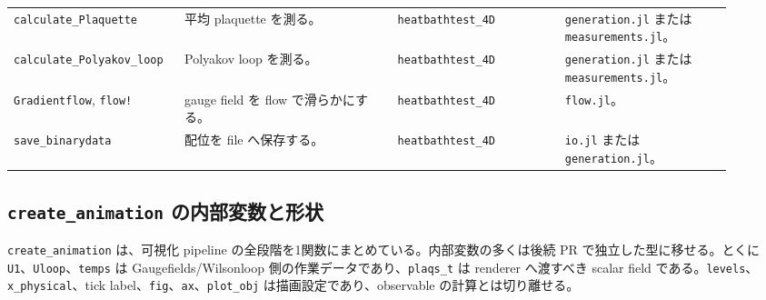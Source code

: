 \documentclass[uplatex,dvipdfmx,ja=standard,11pt,a4paper]{bxjsarticle}
\newcommand{\code}[1]{\texttt{#1}}
\begin{document}
{\begin{longtable}{p{0.20\linewidth}p{0.28\linewidth}p{0.22\linewidth}p{0.22\linewidth}}
\code{calculate\_}\newline\code{Plaquette} & 平均 plaquette を測る。 & \code{heatbathtest\_4D} & \code{generation.jl} または \code{measurements.jl}。 \\
\code{calculate\_}\newline\code{Polyakov\_loop} & Polyakov loop を測る。 & \code{heatbathtest\_4D} & \code{generation.jl} または \code{measurements.jl}。 \\
\code{Gradientflow}, \code{flow!} & gauge field を flow で滑らかにする。 & \code{heatbathtest\_4D} & \code{flow.jl}。 \\
\code{save\_binarydata} & 配位を file へ保存する。 & \code{heatbathtest\_4D} & \code{io.jl} または \code{generation.jl}。 \\
\bottomrule
\end{longtable}
}

\subsection{\texorpdfstring{\code{create\_animation}}{create_animation} の内部変数と形状}
\code{create\_animation} は、可視化 pipeline の全段階を1関数にまとめている。内部変数の多くは後続 PR で独立した型に移せる。とくに \code{U1}、\code{Uloop}、\code{temps} は Gaugefields/Wilsonloop 側の作業データであり、\code{plaqs\_t} は renderer へ渡すべき scalar field である。\code{levels}、\code{x\_physical}、tick label、\code{fig}、\code{ax}、\code{plot\_obj} は描画設定であり、observable の計算とは切り離せる。
\end{document}
